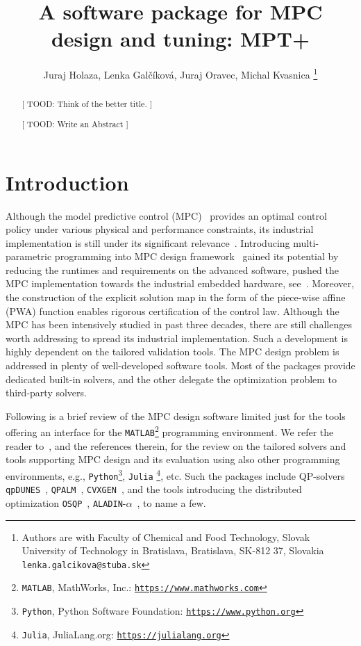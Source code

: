 \documentclass[letterpaper, 10 pt, conference]{ieeeconf}
\title{\LARGE \bf
A software package for MPC design and tuning: MPT+
}
\author{Juraj Holaza, Lenka Gal\v{c}\'{i}kov\'{a}, Juraj Oravec, Michal Kvasnica
\thanks{Authors are with Faculty of Chemical and Food Technology,
		Slovak University of Technology in Bratislava, Bratislava, SK-812 37, Slovakia
        \texttt{lenka.galcikova@stuba.sk}}
}
\begin{document}
\maketitle
\thispagestyle{empty}
\pagestyle{empty}

\begin{abstract}

[ TOOD: Think of the better title. ]

[ TOOD: Write an Abstract ]

\end{abstract}

\section{Introduction}
\label{sec:introduction}

Although the model predictive control (MPC)~\cite{M00, B17} provides an optimal control policy under various physical and performance constraints, its industrial implementation is still under its significant relevance~\cite{QB03}. 
Introducing multi-parametric programming into MPC design framework~\cite{BM02} gained its potential by reducing the runtimes and requirements on the advanced software, pushed the MPC implementation towards the industrial embedded hardware, see~\cite{PK21}. Moreover, the construction of the explicit solution map in the form of the piece-wise affine (PWA) function enables rigorous certification of the control law. 
%
Although the MPC has been intensively studied in past three decades, there are still challenges worth addressing to spread its industrial implementation. Such a development is highly dependent on the tailored validation tools. 
The MPC design problem is addressed in plenty of well-developed software tools. Most of the packages provide dedicated built-in solvers, and the other delegate the optimization problem to third-party solvers. 

Following is a brief review of the MPC design software limited just for the tools offering an interface for the \texttt{MATLAB}\footnote{\texttt{MATLAB}, MathWorks, Inc.: \texttt{\url{https://www.mathworks.com}}} programming environment. We refer the reader to~\cite{KF18,LT17,HS22}, 
and the references therein, for the review on the tailored solvers and tools supporting MPC design and its evaluation using also other programming environments, e.g., \texttt{Python}\footnote{\texttt{Python}, Python Software Foundation: \texttt{\url{https://www.python.org}}}, \texttt{Julia} \footnote{\texttt{Julia}, JuliaLang.org: \texttt{\url{https://julialang.org}}}, etc. Such the packages include QP-solvers \texttt{qpDUNES}~\cite{qpDUNES}, \texttt{QPALM}~\cite{QPALM}, \texttt{CVXGEN}~\cite{CVXGEN}, and the tools introducing the distributed optimization \texttt{OSQP}~\cite{OSQP}, \texttt{ALADIN}-$\alpha$~\cite{EJ21}, to name a few. 
\end{document}
